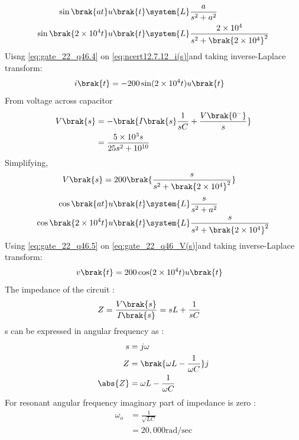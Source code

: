 \documentclass[journal,12pt,twocolumn]{IEEEtran}
\theoremstyle{remark}
\begin{document}
\begin{enumerate}[label=\textbf{(\alph*)}]
\begin{align}
    \sin\brak{at}u\brak{t} &\system{L} \frac{a}{s^2+a^2} \label{eq:gate_22_sint_result}\\
    \sin\brak{2\times10^4 t}u\brak{t} &\system{L} \frac{2\times10^4}{s^2+\brak{2\times10^4}^2}\label{eq:gate_22_q46.4}
\end{align}
Uisng \eqref{eq:gate_22_q46.4} on \eqref{eq:ncert12.7.12_i(s)}and taking inverse-Laplace transform:
\begin{align}
    i\brak{t} &= -200\sin(2\times10^4t)u\brak{t} 
\end{align}
From  voltage across capacitor
\begin{align}
    V\brak{s} &= -\brak{I\brak{s}\frac{1}{sC} + \frac{V\brak{0^-}}{s}}\\
                &= \frac{5\times10^{3}s}{25s^2+10^{10}}\label{eq:gate_22_q46_V(s)}
\end{align}
Simplifying,
\begin{align}
    V\brak{s} &= 200 \brak{\frac{s}{s^2+\brak{2\times10^4}^2}}
\end{align}
\begin{align}
    \cos\brak{at}u\brak{t} &\system{L} \frac{s}{s^2+a^2} \label{eq:gate_22_cost_result}\\
    \cos\brak{2\times10^4t}u\brak{t} &\system{L} \frac{s}{s^2+\brak{2\times10^4}^2}\label{eq:gate_22_q46.5}
\end{align}
Using \eqref{eq:gate_22_q46.5} on \eqref{eq:gate_22_q46_V(s)}and taking inverse-Laplace transform:
\begin{align}
    v\brak{t} &=200\cos(2\times10^4t)u\brak{t}
\end{align}
The impedance of the circuit :
\begin{align}
    Z &=\frac{V\brak{s}}{I\brak{s}}= sL + \frac{1}{sC}
\end{align}
s can be expressed in angular frequency as :
\begin{align}
    s &= j\omega\\
    Z &= \brak{\omega L - \frac{1}{\omega C}}j\\
    \abs{Z} &= \omega L - \frac{1}{\omega C}
\end{align}
For resonant angular frequency imaginary part of impedance is zero :
\begin{align}
     \omega_{o}&=\frac{1}{\sqrt{LC}}\\
          &=20,000 \text{rad/sec}
\end{align}
\begin{figure}[H]

\end{figure}
\end{enumerate}
\end{document}
